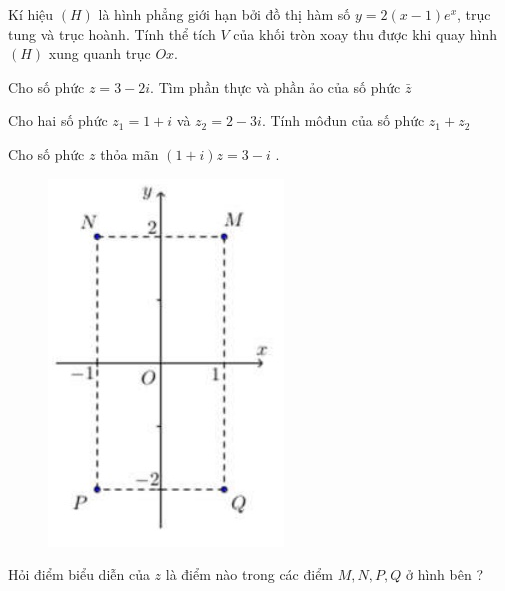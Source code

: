 \begin{vnmultiplechoice}[ rearrange=yes, keycolumns=5]
\begin{question} %
Kí hiệu $(H)$ là hình phẳng giới hạn bởi đồ thị hàm số  $y=2(x-1)e^x$, trục tung
và trục hoành. Tính thể tích $V$ của khối tròn xoay thu được khi quay hình $(H)$ xung
quanh trục $Ox$.
\datcot
\bonpa
{}
{}
{}
{}
\end{question}

\begin{question} %
Cho số phức  $z=3-2i$. Tìm phần thực và phần ảo của số phức $\bar z$
\datcot[2]
\bonpa
{}
{}
{}
{}
\end{question}

\begin{question}%
 Cho hai số phức $z_1=1+i$ và $z_2=2-3i$. Tính môđun của số phức $z_1+z_2$
\datcot
\bonpa
{}
{}
{}
{}
\end{question}


\begin{question} %
Cho số phức $z$ thỏa mãn $(1+i)z=3-i$ . 

\begin{figure}
\examhspace*{3cm}
\includegraphics[scale =0.5]{toan04}
\end{figure}
Hỏi điểm biểu
diễn của $z$ là điểm nào trong các điểm $M, N, P, Q$ ở hình bên ?
\datcot[1]
\bonpa
{}
{}
{}
{}
\end{question}



\end{vnmultiplechoice}
